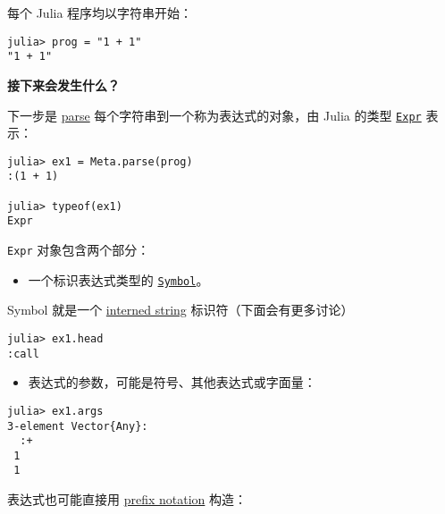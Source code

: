 每个 Julia 程序均以字符串开始：




\begin{verbatim}
julia> prog = "1 + 1"
"1 + 1"
\end{verbatim}



\textbf{接下来会发生什么？}



下一步是 \href{https://en.wikipedia.org/wiki/Parsing\#Computer\_languages}{parse} 每个字符串到一个称为表达式的对象，由 Julia 的类型 \hyperlink{17120496304147995299}{\texttt{Expr}} 表示：




\begin{verbatim}
julia> ex1 = Meta.parse(prog)
:(1 + 1)

julia> typeof(ex1)
Expr
\end{verbatim}



\texttt{Expr} 对象包含两个部分：



\begin{itemize}
\item 一个标识表达式类型的 \hyperlink{18332791376992528422}{\texttt{Symbol}}。

\end{itemize}


Symbol 就是一个 \href{https://en.wikipedia.org/wiki/String\_interning}{interned string}     标识符（下面会有更多讨论）




\begin{verbatim}
julia> ex1.head
:call
\end{verbatim}



\begin{itemize}
\item 表达式的参数，可能是符号、其他表达式或字面量：

\end{itemize}



\begin{verbatim}
julia> ex1.args
3-element Vector{Any}:
  :+
 1
 1
\end{verbatim}



表达式也可能直接用 \href{https://en.wikipedia.org/wiki/Polish\_notation}{prefix notation} 构造：




